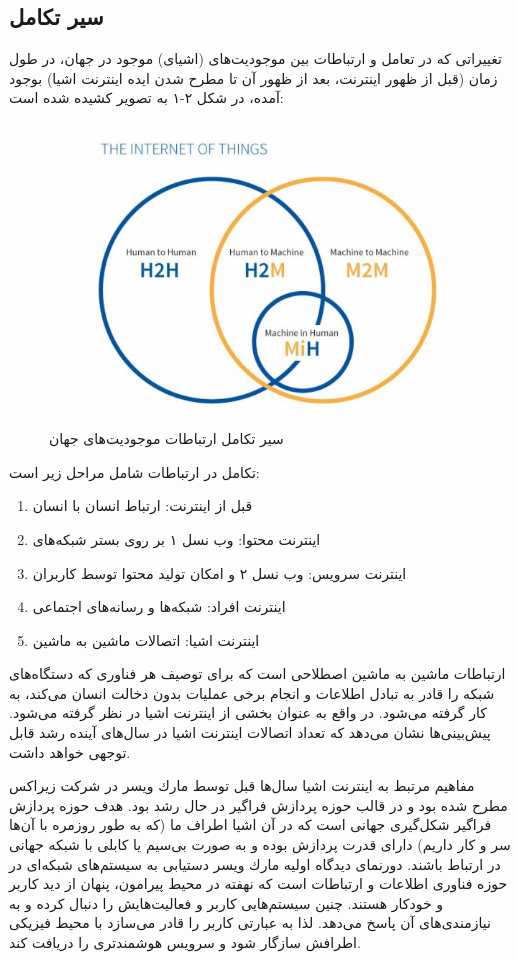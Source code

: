 \subsection{سیر تکامل}
تغییراتی که در تعامل و ارتباطات بین موجودیت‌های (اشیای) موجود در جهان، در طول زمان (قبل از ظهور اینترنت، بعد از ظهور آن تا مطرح شدن ایده اینترنت اشیا) بوجود آمده، در شكل ۲-۱ به
تصویر کشیده شده است:
\begin{figure}[!h]
	\centerline{\includegraphics[width=.7\textwidth]{iot-m2m}}
	\caption{سیر تکامل ارتباطات موجودیت‌های جهان \cite{connection}}
\end{figure}

تكامل در ارتباطات شامل مراحل زیر است:
\begin{enumerate}
	\item
	 قبل از اینترنت: ارتباط انسان با انسان
	\item
	اینترنت محتوا: وب نسل ۱ بر روی بستر شبکه‌های 
	\item 
	اینترنت سرویس: وب نسل ۲ و امکان تولید محتوا توسط کاربران
	\item 
	اینترنت افراد: شبکه‌ها و رسانه‌های اجتماعی
	\item
	اینترنت اشیا: اتصالات ماشین به ماشین
\end{enumerate}


ارتباطات ماشین به ماشین  اصطلاحی است که برای توصیف هر فناوری که دستگاه‌های شبكه را قادر به تبادل اطلاعات و انجام برخی عملیات بدون دخالت انسان می‌کند، به کار گرفته می‌شود. در واقع به عنوان بخشی از اینترنت اشیا در نظر گرفته می‌شود. پیش‌بینی‌ها نشان می‌دهد که تعداد اتصالات اینترنت اشیا در سال‌های آینده رشد قابل توجهی خواهد داشت.


مفاهیم مرتبط به اینترنت اشیا سال‌ها قبل توسط مارك ویسر در شرکت زیراکس مطرح شده بود و
در قالب حوزه پردازش فراگیر در حال رشد بود. هدف حوزه پردازش فراگیر شكل‌گیری جهانی است که در آن اشیا اطراف ما (که به طور روزمره با آن‌ها سر و کار داریم) دارای قدرت پردازش بوده و به
صورت بی‌سیم یا کابلی با شبكه جهانی در ارتباط باشند. دورنمای دیدگاه اولیه مارك ویسر دستیابی به سیستم‌های شبكه‌ای در حوزه فناوری اطلاعات و ارتباطات است که نهفته در محیط پیرامون، پنهان از دید کاربر و خودکار هستند. چنین سیستم‌هایی کاربر و فعالیت‌هایش را دنبال کرده و به نیازمندی‌های آن پاسخ می‌دهد. لذا به عبارتی کاربر را قادر می‌سازد با محیط فیزیكی اطرافش سازگار شود و سرویس هوشمندتری را دریافت کند.

